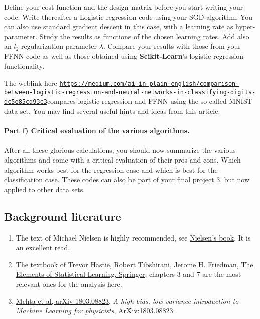 \documentclass[%
oneside,                 %
final,                   %
10pt]{article}
\begin{document}
Define your cost function and the design matrix before you start writing your code.
Write thereafter a Logistic regression code using your SGD algorithm. You can also use standard gradient descent in this case, with a learning rate as hyper-parameter.
Study the results as functions of the chosen learning rates.
Add also an $l_2$ regularization parameter $\lambda$. Compare your results with those from your FFNN code as well as those obtained using \textbf{Scikit-Learn}'s logistic regression functionality.

The weblink  here \href{{https://medium.com/ai-in-plain-english/comparison-between-logistic-regression-and-neural-networks-in-classifying-digits-dc5e85cd93c3}}{\nolinkurl{https://medium.com/ai-in-plain-english/comparison-between-logistic-regression-and-neural-networks-in-classifying-digits-dc5e85cd93c3}}compares logistic regression and FFNN using the so-called MNIST data set. You may find several useful hints and ideas from this article. 


\paragraph{Part f) Critical evaluation of the various algorithms.}
After all these glorious calculations, you should now summarize the
various algorithms and come with a critical evaluation of their pros
and cons. Which algorithm works best for the regression case and which
is best for the classification case. These codes can also be part of
your final project 3, but now applied to other data sets.




\subsection{Background literature}

\begin{enumerate}
\item The text of Michael Nielsen is highly recommended, see \href{{http://neuralnetworksanddeeplearning.com/}}{Nielsen's book}. It is an excellent read.

\item The textbook of \href{{https://www.springer.com/gp/book/9780387848570}}{Trevor Hastie, Robert Tibshirani, Jerome H. Friedman, The Elements of Statistical Learning, Springer}, chapters 3 and 7 are the most relevant ones for the analysis here. 

\item \href{{https://arxiv.org/abs/1803.08823}}{Mehta et al, arXiv 1803.08823}, \emph{A high-bias, low-variance introduction to Machine Learning for physicists}, ArXiv:1803.08823.
\end{enumerate}
\end{document}
